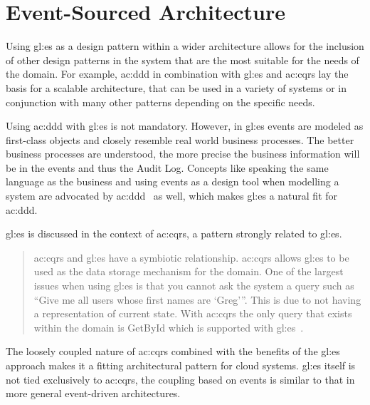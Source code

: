 
\section{Event-Sourced Architecture}\label{sec:esa}

Using \gls{gl:es} as a design pattern within a wider architecture allows for the inclusion of other design patterns in the system that are the most suitable for the needs of the domain. For example, \gls{ac:ddd} in combination with \gls{gl:es} and \gls{ac:cqrs} lay the basis for a scalable architecture, that can be used in a variety of systems or in conjunction with many other patterns depending on the specific needs.


Using \gls{ac:ddd} with \gls{gl:es} is not mandatory. However, in \gls{gl:es} events are modeled as first-class objects and closely resemble real world business processes. The better business processes are understood, the more precise the business information will be in the events and thus the Audit Log. Concepts like speaking the same language as the business and using events as a design tool when modelling a system are advocated by \gls{ac:ddd}~\citep{evans2004domain} as well, which makes \gls{gl:es} a natural fit for \gls{ac:ddd}.


\gls{gl:es} is discussed in the context of \gls{ac:cqrs}, a pattern strongly related to \gls{gl:es}.

\begin{quote}
\gls{ac:cqrs} and \gls{gl:es} have a symbiotic relationship. \gls{ac:cqrs} allows \gls{gl:es} to be used as the
data storage mechanism for the domain. One of the largest issues when using \gls{gl:es} is that you
cannot ask the system a query such as “Give me all users whose first names are ‘Greg’”. This is due to
not having a representation of current state. With \gls{ac:cqrs} the only query that exists within the domain is
GetById which is supported with \gls{gl:es}~\citep{young2010cqrs}.
\end{quote}

The loosely coupled nature of \gls{ac:cqrs} combined with the benefits of the \gls{gl:es} approach makes it a fitting architectural pattern for cloud systems. \gls{gl:es} itself is not tied exclusively to \gls{ac:cqrs}, the coupling based on events is similar to that in more general event-driven architectures.


